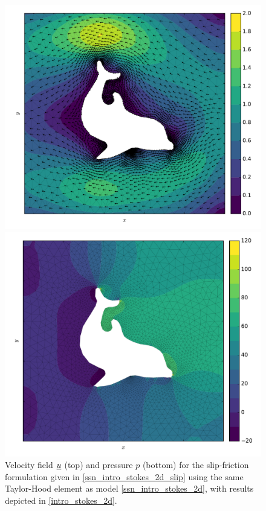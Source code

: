 \begin{figure}
  \centering
  \begin{minipage}[b]{0.60\linewidth}
    \includegraphics[width=\linewidth]{images/fenics_intro/2Dstokes_nitsche_u.pdf}
  \end{minipage}
  \quad
  \begin{minipage}[b]{0.60\linewidth}
    \includegraphics[width=\linewidth]{images/fenics_intro/2Dstokes_nitsche_p.pdf}
  \end{minipage}
  \caption[Two-dimensional-slip-friction Stokes example]{Velocity field $\underline{u}$ (top) and pressure $p$ (bottom) for the slip-friction formulation given in \cref{ssn_intro_stokes_2d_slip} using the same Taylor-Hood element as model \cref{ssn_intro_stokes_2d}, with results depicted in \cref{intro_stokes_2d}.}
  \label{intro_stokes_2d_nitsche}
\end{figure}
